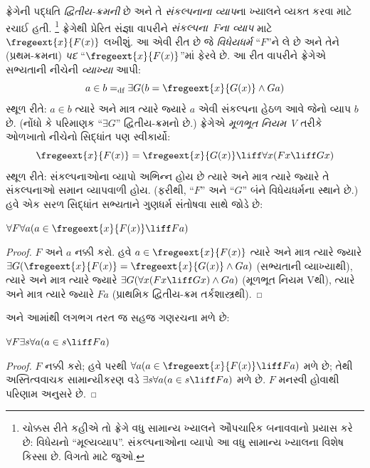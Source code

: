ફ્રેગેની પદ્ધતિ \emph{દ્વિતીય-ક્રમની} છે અને તે
\emph{સંકલ્પનાના વ્યાપ}ના ખ્યાલને વ્યક્ત કરવા માટે રચાઈ હતી.
\footnote{ચોક્કસ રીતે કહીએ તો ફ્રેગે વધુ સામાન્ય ખ્યાલને
ઔપચારિક બનાવવાનો પ્રયાસ કરે છે: વિધેયનો ``મૂલ્યવ્યાપ''.
સંકલ્પનાઓના વ્યાપો આ વધુ સામાન્ય ખ્યાલના વિશેષ કિસ્સા છે.
વિગતો માટે \citet[pp.\ 8--9]{Heck2012} જુઓ.}
ફ્રેગેથી પ્રેરિત સંજ્ઞા વાપરીને
\emph{સંકલ્પના~$F$ના વ્યાપ} માટે $\fregeext{x}{F(x)}$ લખીશું.
આ એવી રીત છે જે \emph{વિધેયધર્મ} ``$F$''ને લે છે અને તેને
(પ્રથમ-ક્રમના) \emph{પદ} ``$\fregeext{x}{F(x)}$''માં ફેરવે છે.
આ રીત વાપરીને ફ્રેગેએ સભ્યતાની નીચેની \emph{વ્યાખ્યા} આપી:
\[
a \in b =_\text{df} \exists G(b = \fregeext{x}{G(x)} \land Ga)
\]
સ્થૂળ રીતે: $a \in b$ ત્યારે અને માત્ર ત્યારે જ્યારે $a$ એવી
સંકલ્પના હેઠળ આવે જેનો વ્યાપ $b$ છે. (નોંધો કે પરિમાણક
``$\exists G$'' દ્વિતીય-ક્રમનો છે.) ફ્રેગેએ
\emph{મૂળભૂત નિયમ V} તરીકે ઓળખાતો નીચેનો સિદ્ધાંત પણ સ્વીકાર્યો:
$$\fregeext{x}{F(x)} = \fregeext{x}{G(x)} \liff \forall x (Fx \liff Gx)$$
સ્થૂળ રીતે: સંકલ્પનાઓના વ્યાપો અભિન્ન હોય છે ત્યારે અને માત્ર
ત્યારે જ્યારે તે સંકલ્પનાઓ સમાન વ્યાપવાળી હોય. (ફરીથી, ``$F$''
અને ``$G$'' બંને વિધેયધર્મના સ્થાને છે.) હવે એક સરળ સિદ્ધાંત
સભ્યતાને ગુણધર્મ સંતોષવા સાથે જોડે છે:

\begin{lem}
$\forall F \forall a(a \in \fregeext{x}{F(x)} \liff Fa)$
\end{lem}

\begin{proof}
$F$ અને $a$ નક્કી કરો. હવે $a \in \fregeext{x}{F(x)}$ ત્યારે અને
માત્ર ત્યારે જ્યારે $\exists G(\fregeext{x}{F(x)}
= \fregeext{x}{G(x)} \land Ga)$ (સભ્યતાની વ્યાખ્યાથી), ત્યારે અને
માત્ર ત્યારે જ્યારે $\exists G(\forall x(Fx \liff Gx) \land Ga)$
(મૂળભૂત નિયમ Vથી), ત્યારે અને માત્ર ત્યારે જ્યારે $Fa$
(પ્રાથમિક દ્વિતીય-ક્રમ તર્કશાસ્ત્રથી).
\end{proof}

અને આમાંથી લગભગ તરત જ સહજ ગણરચના મળે છે:

\begin{lem}
$\forall F \exists s \forall a (a \in s \liff Fa)$
\end{lem}

\begin{proof}
$F$ નક્કી કરો; હવે  પરથી
$\forall a (a \in
\fregeext{x}{F(x)} \liff Fa)$ મળે છે; તેથી અસ્તિત્વવાચક
સામાન્યીકરણ વડે $\exists s\forall a(a \in s \liff Fa)$ મળે છે.
$F$ મનસ્વી હોવાથી પરિણામ અનુસરે છે.
\end{proof}

